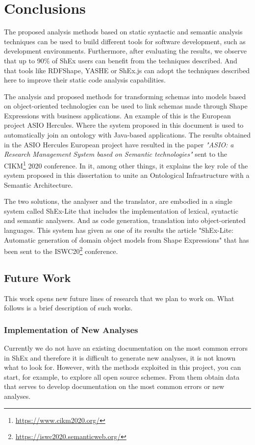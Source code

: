 \chapter{Conclusions}
\label{ch:conclusions}
The proposed analysis methods based on static syntactic and semantic analysis
techniques can be used to build different tools for software development, such
as development environments. Furthermore, after evaluating the results, we observe
that up to 90\% of ShEx users can benefit from the techniques described. And that
tools like RDFShape, YASHE or ShEx.js can adopt the techniques described here to
improve their static code analysis capabilities.

The analysis and proposed methods for transforming
schemas into models based on object-oriented technologies can be used to link
schemas made through Shape Expressions with business applications. An example
of this is the European project ASIO Hercules. Where the system proposed in
this document is used to automatically join an ontology with Java-based applications.
The results obtained in the ASIO Hercules European project have resulted in the paper \textit{"ASIO: a Research
Management System based on Semantic technologies"} sent to the CIKM\footnote{\url{https://www.cikm2020.org/}} 2020 conference.
In it, among other things, it explains the key role of the system proposed in this
dissertation to unite an Ontological Infrastructure with a Semantic Architecture.

The two solutions, the analyser and the translator, are embodied in a single system
called ShEx-Lite that includes the implementation of lexical, syntactic and semantic
analysers. And as code generation, translation into object-oriented languages. This
system has given as one of its results the article "ShEx-Lite: Automatic generation
of domain object models from Shape Expressions" that has been sent to the ISWC20\footnote{\url{https://iswc2020.semanticweb.org/}}
conference.

\section{Future Work}
This work opens new future lines of research that we plan to work on.
What follows is a brief description of such works.

\subsection{Implementation of New Analyses}
Currently we do not have an existing documentation on the most common errors
in ShEx and therefore it is difficult to generate new analyses, it is not known
what to look for. However, with the methods exploited in this project, you can
start, for example, to explore all open source schemes. From them obtain data
that serves to develop documentation on the most common errors or new analyses.

